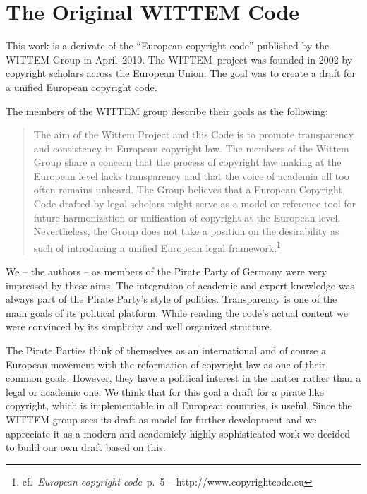 \section{The Original WITTEM Code}

This work is a derivate of the ``European copyright code'' published by the WITTEM Group in April~2010. The WITTEM~project was founded in 2002 by copyright scholars across the European Union. The goal was to create a draft for a unified European copyright code. 

The members of the WITTEM group describe their goals as the following:

\begin{quote}
	The aim of the Wittem Project and this Code is to promote transparency and
consistency in European copyright law. The members of the Wittem Group
share a concern that the process of copyright law making at the European
level lacks transparency and that the voice of academia all too often remains
unheard. The Group believes that a European Copyright Code drafted by legal
scholars might serve as a model or reference tool for future harmonization
or unification of copyright at the European level. Nevertheless, the Group
does not take a position on the desirability as such of introducing a unified
European legal framework.\footnote{cf.~\textit{European copyright code}~p.~5 -- http://www.copyrightcode.eu}
\end{quote}

We -- the authors -- as members of the Pirate Party of Germany were very impressed by these aims. The integration of academic and expert knowledge was always part of the Pirate Party's style of politics. Transparency is one of the main goals of its political platform. While reading the code's actual content we were convinced by its simplicity and well organized structure. 

The Pirate Parties think of themselves as an international and of course a European movement with the reformation of copyright law as one of their common goals. However, they have a political interest in the matter rather than a legal or academic one. We think that for this goal a draft for a pirate like copyright, which is implementable in all European countries, is useful. Since the WITTEM group sees its draft as model for further development and we appreciate it as a modern and academicly highly sophisticated work we decided to build our own draft based on this. 